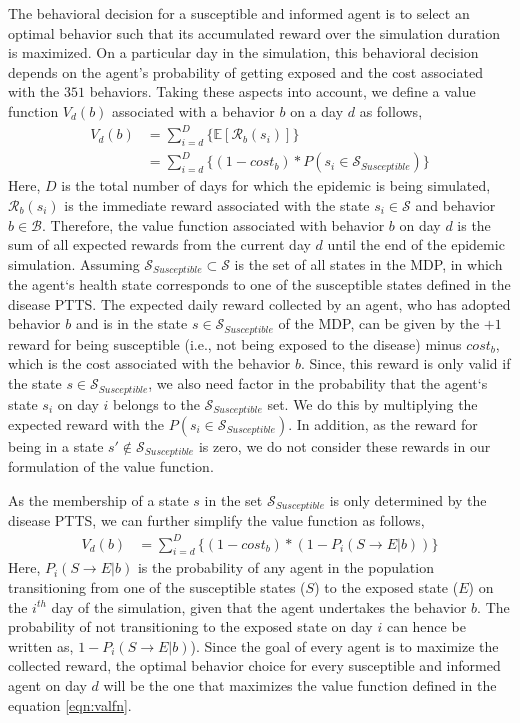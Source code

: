 \documentclass[doublespace,draft]{VTthesis}
\begin{document}
    The behavioral decision for a susceptible and informed agent is to select an optimal behavior such that its accumulated reward over the simulation duration is maximized. On a particular day in the simulation, this behavioral decision depends on the agent's probability of getting exposed and the cost associated with the $351$ behaviors. Taking these aspects into account, we define a value function $V_d(b)$ associated with a behavior $b$ on a day $d$ as follows,
    \begin{align*}
    V_d(b) &= \sum_{i=d}^D \bigg\{ \mathbb{E} [\mathcal{R}_b(s_i)] \bigg\}  \\
        &= \sum_{i=d}^D \bigg\{ (1 - cost_b) * P(s_i \in \mathcal{S}_{Susceptible}) \bigg\} 
    \end{align*}
    Here, $D$ is the total number of days for which the epidemic is being simulated, $\mathcal{R}_b(s_i)$ is the immediate reward associated with the state $s_i \in \mathcal{S}$ and behavior $b \in \mathcal{B}$. Therefore, the value function associated with behavior $b$ on day $d$ is the sum of all expected rewards from the current day $d$ until the end of the epidemic simulation. Assuming $\mathcal{S}_{Susceptible} \subset \mathcal{S}$ is the set of all states in the MDP, in which the agent`s health state corresponds to one of the susceptible states defined in the disease PTTS. The expected daily reward collected by an agent, who has adopted behavior $b$ and is in the state $s \in \mathcal{S}_{Susceptible}$ of the MDP, can be given by the $+1$ reward for being susceptible (i.e., not being exposed to the disease) minus $cost_b$, which is the cost associated with the behavior $b$. Since, this reward is only valid if the state $s \in \mathcal{S}_{Susceptible}$, we also need factor in the probability that the agent`s state $s_i$ on day $i$ belongs to the $\mathcal{S}_{Susceptible}$ set. We do this by multiplying the expected reward with the $P(s_i \in \mathcal{S}_{Susceptible})$. In addition, as the reward for being in a state $s' \notin \mathcal{S}_{Susceptible}$ is zero, we do not consider these rewards in our formulation of the value function. 
    
    As the membership of a state $s$ in the set $\mathcal{S}_{Susceptible}$ is only determined by the disease PTTS, we can further simplify the value function as follows,
    \begin{align}
    V_d(b) &= \sum_{i=d}^D \bigg\{ (1-cost_b) * (1 - P_i(S \rightarrow E|b)) \bigg\} 
    \label{eqn:valfn}
    \end{align}
    Here, $P_i(S \rightarrow E|b)$ is the probability of any agent in the population transitioning from one of the susceptible states ($S$) to the exposed state ($E$) on the $i^{th}$ day of the simulation, given that the agent undertakes the behavior $b$. The probability of not transitioning to the exposed state on day $i$ can hence be written as, $1 - P_i(S \rightarrow E|b)$). Since the goal of every agent is to maximize the collected reward, the optimal behavior choice for every susceptible and informed agent on day $d$ will be the one that maximizes the value function defined in the equation \ref{eqn:valfn}. 
    
\end{document}
